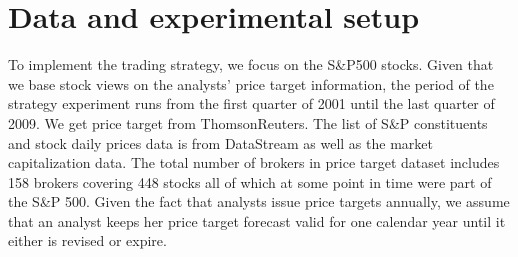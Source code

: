 \documentclass{llncs}\usepackage[]{graphicx}\usepackage[]{color}
\begin{document}
%

\section{Data and experimental setup}
\label{ch4-sec:data}


To implement  the trading strategy, we focus on the  S\&P500 stocks. Given that we base  stock views on the analysts' price target information, the period of the strategy experiment runs from the first quarter of 2001 until the last quarter of 2009. We get price target from ThomsonReuters.   The list of S\&P constituents and stock daily prices data is from DataStream as well as the market capitalization data.  The total number of brokers in price target dataset includes 158 brokers covering 448 stocks all of which at some point in time were part of the S\&P 500. Given the fact that analysts issue price targets annually, we assume that an analyst keeps her price target forecast valid for one calendar year until it either is revised or expire.
\end{document}
